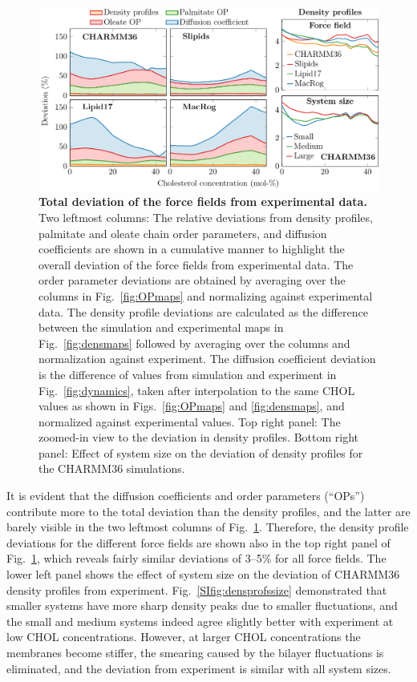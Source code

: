\documentclass[aps,prl,superscriptaddress]{revtex4-2}
\begin{document}
\begin{figure}[htb!]
  \centering
  \includegraphics[width=\linewidth]{../FIGS/deviation.pdf}
  \caption{\label{fig:deviation}%
  \textbf{Total deviation of the force fields from experimental data.} 
%
  Two leftmost columns:
  The relative deviations from density profiles, palmitate and oleate chain order parameters, and diffusion coefficients are shown in a cumulative manner to highlight the overall deviation of the force fields from experimental data.
  The order parameter deviations are obtained by averaging over the columns in Fig.~\ref{fig:OPmaps} and normalizing against experimental data. The density profile deviations are calculated as the difference between the simulation and experimental maps in Fig.~\ref{fig:densmaps} followed by averaging over the columns and normalization against experiment. The diffusion coefficient deviation is the difference of values from simulation and experiment in Fig.~\ref{fig:dynamics}, taken after interpolation to the same CHOL values as shown in Figs.~\ref{fig:OPmaps} and \ref{fig:densmaps}, and normalized against experimental values.
%
  Top right panel:
  The zoomed-in view to the deviation in density profiles.
%
  Bottom right panel:
  Effect of system size on the deviation of density profiles for the CHARMM36 simulations.
  }
\end{figure}

It is evident that the diffusion coefficients and order parameters (``OPs'') contribute more to the total deviation than the density profiles, and the latter are barely visible in the two leftmost columns of Fig.~\ref{fig:deviation}. Therefore, the density profile deviations for the different force fields are shown also in the top right panel of Fig.~\ref{fig:deviation}, which reveals fairly similar deviations of 3--5\% for all force fields. The lower left panel shows the effect of system size on the deviation of CHARMM36 density profiles from experiment. Fig.~\ref{SIfig:densprofssize} demonstrated that smaller systems have more sharp density peaks due to smaller fluctuations, and the small and medium systems indeed agree slightly better with experiment at low CHOL concentrations. However, at larger CHOL concentrations the membranes become stiffer, the smearing caused by the bilayer fluctuations is eliminated, and the deviation from experiment is similar with all system sizes. 
\end{document}
